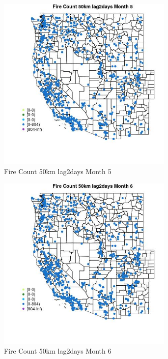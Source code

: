 \begin{figure} 
\centering  
\includegraphics[width=0.77\textwidth]{Code_Outputs/Report_ML_input_PM25_Step4_part_f_de_duplicated_aves_prioritize_24hr_obswNAs_MapObsMo5Fire_Count_50km_lag2days.jpg} 
\caption{\label{fig:Report_ML_input_PM25_Step4_part_f_de_duplicated_aves_prioritize_24hr_obswNAsMapObsMo5Fire_Count_50km_lag2days}Fire Count 50km lag2days Month 5} 
\end{figure} 
 

\begin{figure} 
\centering  
\includegraphics[width=0.77\textwidth]{Code_Outputs/Report_ML_input_PM25_Step4_part_f_de_duplicated_aves_prioritize_24hr_obswNAs_MapObsMo6Fire_Count_50km_lag2days.jpg} 
\caption{\label{fig:Report_ML_input_PM25_Step4_part_f_de_duplicated_aves_prioritize_24hr_obswNAsMapObsMo6Fire_Count_50km_lag2days}Fire Count 50km lag2days Month 6} 
\end{figure} 
 

